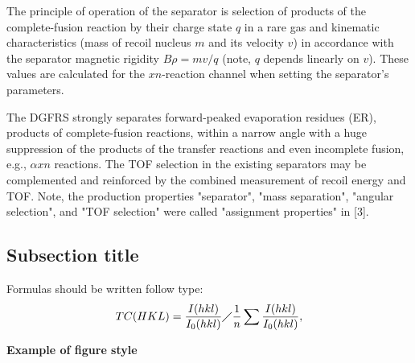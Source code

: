 \documentclass[12pt,a4paper,twoside]{article}
\begin{document}
The principle of operation of the separator is selection of products of the complete-fusion reaction by their charge state $q$ in a rare gas and kinematic characteristics (mass of recoil nucleus $m$ and its velocity $v$) in accordance with the separator magnetic rigidity $B\rho=mv/q$ (note, $q$ depends linearly on $v$). These values are calculated for the $xn$-reaction channel when setting the separator's parameters. 

The DGFRS strongly separates forward-peaked evaporation residues (ER), products of complete-fusion reactions, within a narrow angle with a huge suppression of the products of the transfer reactions and even incomplete fusion, e.g., $\alpha xn$ reactions. The TOF selection in the existing separators may be complemented and reinforced by the combined measurement of recoil energy and TOF. Note, the production properties "separator", "mass separation", "angular selection", and "TOF selection" were called "assignment properties" in [3].

\subsection*{Subsection title}

Formulas should be written follow type:
\begin{equation}
TC(HKL)= \frac{I(hkl)}{I_0(hkl)}\diagup\frac{1}{n}\sum{\frac{I(hkl)}{I_0(hkl)}},\label{}
\end{equation}

\begin{flushleft}
\textbf{Example of figure style}
\end{flushleft}
\end{document}
